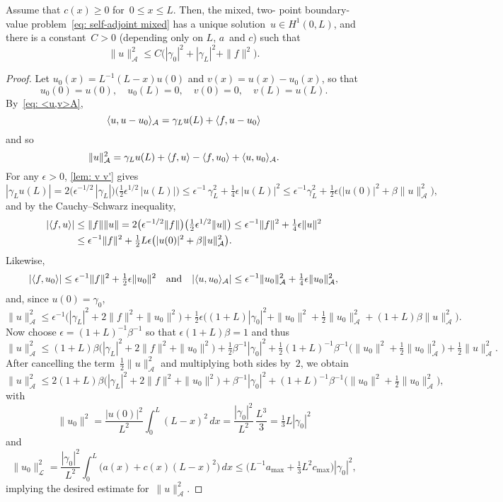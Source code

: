 \begin{theorem}\label{thm: ||u||A}
Assume that $c(x)\ge0$ for~$0\le x\le L$.  Then, the mixed, two-
point boundary-value problem~\eqref{eq: self-adjoint mixed} has a unique
solution~$u\in H^1(0,L)$, and there is a constant~$C>0$ (depending only on $L$,
$a$~and $c$) such that
\[
\|u\|_{\mathcal{A}}^2\le C\bigl(|\gamma_0|^2+|\gamma_L|^2+\|f\|^2\bigr).
\]
\end{theorem}
\begin{proof}
Let $u_0(x)=L^{-1}(L-x)u(0)$ and $v(x)=u(x)-u_0(x)$, so that
\[
u_0(0)=u(0),\quad u_0(L)=0,\quad v(0)=0,\quad v(L)=u(L).
\]
By~\eqref{eq: <u,v>A},
\[
\langle u,u-u_0\rangle_{\mathcal{A}}=\gamma_Lu(L)+\langle f,u-u_0\rangle
\]
and so
\[
\|u\|_{\mathcal{A}}^2=\gamma_L u(L)+\langle f,u\rangle-\langle f,u_0\rangle
	+\langle u,u_0\rangle_{\mathcal{A}}.
\]
For any $\epsilon>0$, \cref{lem: v v'} gives
\[
|\gamma_L u(L)|=2\bigl(\epsilon^{-1/2}\,|\gamma_L|\bigr)
	\bigl(\tfrac12\epsilon^{1/2}\,|u(L)|\bigr)
\le\epsilon^{-1}\,\gamma_L^2
	+\tfrac14\epsilon\,|u(L)|^2
	\le\epsilon^{-1}\gamma_L^2+\tfrac12\epsilon\bigl(|u(0)|^2
	+\beta\|u\|_{\mathcal{A}}^2\bigr),
\]
and by the Cauchy--Schwarz inequality,
\begin{align*}
|\langle f,u\rangle|&\le\|f\|\|u\|=2\bigl(\epsilon^{-1/2}\|f\|\bigr)
	\bigl(\tfrac12\epsilon^{1/2}\|u\|\bigr)
	\le\epsilon^{-1}\|f\|^2+\tfrac14\epsilon\|u\|^2\\
	&\le\epsilon^{-1}\|f\|^2
	+\tfrac12 L\epsilon\bigl(|u(0)|^2+\beta\|u\|_{\mathcal{A}}^2\bigr).
\end{align*}
Likewise,
\[
|\langle f,u_0\rangle|\le\epsilon^{-1}\|f\|^2+\tfrac12\epsilon\|u_0\|^2
\quad\text{and}\quad
|\langle u,u_0\rangle_{\mathcal{A}}|\le\epsilon^{-1}\|u_0\|_{\mathcal{A}}^2
	+\tfrac14\epsilon\|u_0\|_{\mathcal{A}}^2,
\]
and, since $u(0)=\gamma_0$,
\[
\|u\|_{\mathcal{A}}^2\le\epsilon^{-1}\bigl(|\gamma_L|^2+2\|f\|^2+\|u_0\|^2\bigr)
+\tfrac12\epsilon\bigl((1+L)|\gamma_0|^2+\|u_0\|^2
	+\tfrac12\|u_0\|_{\mathcal{A}}^2+(1+L)\beta\|u\|_{\mathcal{A}}^2\bigr).
\]
Now choose $\epsilon=(1+L)^{-1}\beta^{-1}$ so that $\epsilon(1+L)\beta=1$ and 
thus
\[
\|u\|_{\mathcal{A}}^2\le(1+L)\beta\bigl(|\gamma_L|^2+2\|f\|^2+\|u_0\|^2\bigr)
	+\tfrac12\beta^{-1}|\gamma_0|^2+\tfrac12(1+L)^{-1}\beta^{-1}
	\bigl(\|u_0\|^2+\tfrac12\|u_0\|_{\mathcal{A}}^2\bigr)
	+\tfrac12\|u\|_{\mathcal{A}}^2.
\]
After cancelling the term~$\tfrac12\|u\|_{\mathcal{A}}^2$ and multiplying both
sides by~$2$, we obtain
\[
\|u\|_{\mathcal{A}}^2\le2(1+L)\beta\bigl(|\gamma_L|^2+2\|f\|^2+\|u_0\|^2\bigr)
	+\beta^{-1}|\gamma_0|^2+(1+L)^{-1}\beta^{-1}
	\bigl(\|u_0\|^2+\tfrac12\|u_0\|_{\mathcal{A}}^2\bigr),
\]
with
\[
\|u_0\|^2=\frac{|u(0)|^2}{L^2}\int_0^L(L-x)^2\,dx
	=\frac{|\gamma_0|^2}{L^2}\,\frac{L^3}{3}=\tfrac13L|\gamma_0|^2
\]
and
\[
\|u_0\|_{\mathcal{L}}^2=\frac{|\gamma_0|^2}{L^2}\int_0^L\bigl(
	a(x)+c(x)(L-x)^2\bigr)\,dx
	\le\bigl(L^{-1}a_{\max}+\tfrac13L^2c_{\max}\bigr)|\gamma_0|^2,
\]
implying the desired estimate for~$\|u\|_{\mathcal{A}}^2$.
\end{proof}

